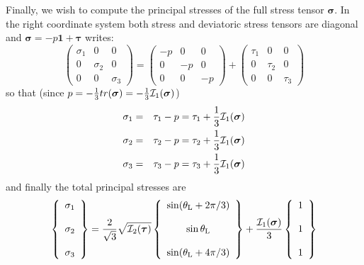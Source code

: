 Finally, we wish to compute the principal stresses of the full stress tensor ${\bm \sigma}$.
In the right coordinate system both stress and deviatoric stress tensors are diagonal and 
${\bm \sigma}=-p {\bm 1} + {\bm \tau}$ writes:
\[
\left(
\begin{array}{ccc}
\sigma_1 &0 &0 \\
0& \sigma_2 &0 \\
0&0 & \sigma_3  
\end{array}
\right)
=
\left(
\begin{array}{ccc}
-p&0&0\\
0&-p&0\\
0&0&-p
\end{array}
\right)
+
\left(
\begin{array}{ccc}
\tau_1 & 0&0 \\
0& \tau_2 & 0\\
0&0 & \tau_3  
\end{array}
\right)
\]
so that (since $p=-\frac{1}{3}tr({\bm \sigma})=-\frac{1}{3}{\cal I}_1({\bm \sigma})$) 
\begin{eqnarray}
\sigma_1 &=& \tau_1 - p = \tau_1 + \frac{1}{3}{\cal I}_1({\bm \sigma})\\ 
\sigma_2 &=& \tau_2 - p = \tau_2 + \frac{1}{3}{\cal I}_1({\bm \sigma})\\ 
\sigma_3 &=& \tau_3 - p = \tau_3 + \frac{1}{3}{\cal I}_1({\bm \sigma}) 
\end{eqnarray}
and finally the total principal stresses are
\begin{equation}
\left\{
\begin{array}{c}
\sigma_1 \\ \\
\sigma_2 \\ \\
\sigma_3
\end{array}
\right\}
= \frac{2  }{\sqrt{3}}\sqrt{ {\cal I}_2({\bm \tau})  }
\left\{
\begin{array}{c}
\sin (\theta_{\rm L} + 2\pi/3)  \\ \\
\sin \theta_{\rm L}   \\ \\
\sin (\theta_{\rm L} + 4\pi/3  )
\end{array}
\right\}
+
\frac{{\cal I}_1({\bm \sigma})}{3}
\left\{
\begin{array}{c}
1 \\ \\
1 \\ \\
1
\end{array}
\right\}
\end{equation}
